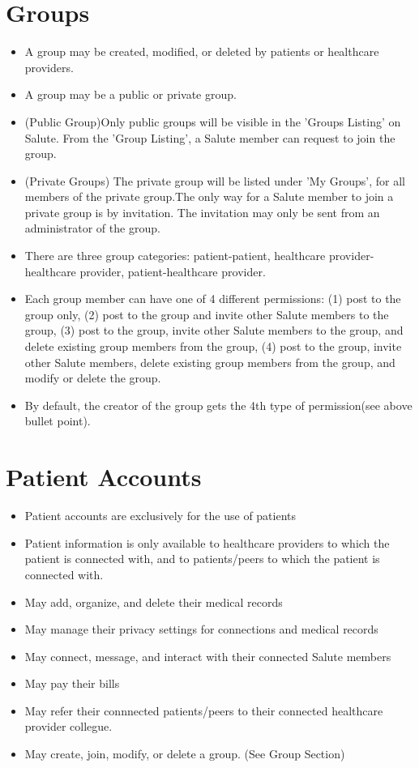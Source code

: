 \section{Groups}
\begin{itemize}
\item A group may be created, modified, or deleted by patients or healthcare providers.
\item A group may be a public or private group. 
\item (Public Group)Only public groups will be visible in the 'Groups Listing' on Salute. From the 'Group Listing', a Salute member can request to join the group.
\item (Private Groups) The private group will be listed under 'My Groups', for all members of the private group.The only way for a Salute member to join a private group is by invitation. The invitation may only be sent from an administrator of the group.
\item There are three group categories: patient-patient, healthcare provider-healthcare provider, patient-healthcare provider.
\item Each group member can have one of 4 different permissions: (1) post to the group only, (2) post to the group and invite other Salute members to the group, (3) post to the group, invite other Salute members to the group, and delete existing group members from the group, (4) post to the group, invite other Salute members, delete existing group members from the group, and modify or delete the group.
\item By default, the creator of the group gets the 4th type of permission(see above bullet point). 
\end{itemize} 

\section{Patient Accounts}
\begin{itemize}
\item Patient accounts are exclusively for the use of patients
\item Patient information is only available to healthcare providers to which the patient is connected with, and to patients/peers to which the patient is connected with.
\item May add, organize, and delete their medical records
\item May manage their privacy settings for connections and medical records
\item May connect, message, and interact with their connected Salute members
\item May pay their bills 
\item May refer their connnected patients/peers to their connected healthcare provider collegue.
\item May create, join, modify, or delete a group. (See Group Section)
\end{itemize}

